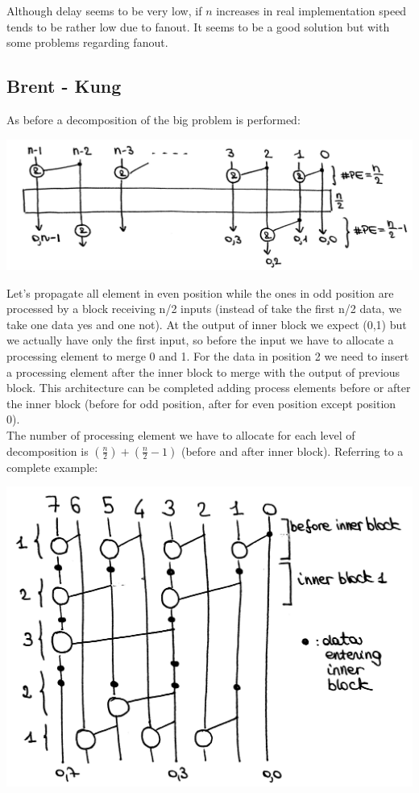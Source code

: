 Although delay seems to be very low, if $n$ increases in real implementation speed tends to be rather low due to fanout. It seems to be a good solution but with some problems regarding fanout.

\subsection{Brent - Kung}
As before a decomposition of the big problem is performed:

\begin{center}
  \includegraphics[width=0.7\linewidth]{img/img2/22}
\end{center}

Let's propagate all element in even position while the ones in odd position are processed by a block receiving n/2 inputs (instead of take the first n/2 data, we take one data yes and one not). At the output of inner block we expect (0,1) but we actually have only the first input, so before the input we have to allocate a processing element to merge 0 and 1. For the data in position 2 we need to insert a processing element after the inner block to merge with the output of previous block. This architecture can be completed adding process elements before or after the inner block (before for odd position, after for even position except position 0).\\

The number of processing element we have to allocate for each level of decomposition is $(\frac{n}{2}) + ( \frac{n}{2} -1)$ (before and after inner block). Referring to a complete example:

\begin{center}
  \includegraphics[width=0.7\linewidth]{img/img2/23}
\end{center}

